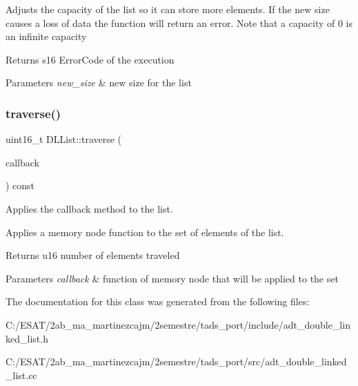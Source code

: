 Adjusts the capacity of the list so it can store more elements. If the new size causes a loss of data the function will return an error. Note that a capacity of 0 is an infinite capacity

\begin{DoxyReturn}{Returns}
s16 Error\+Code of the execution 
\end{DoxyReturn}

\begin{DoxyParams}{Parameters}
{\em new\+\_\+size} & new size for the list \\
\hline
\end{DoxyParams}
\mbox{\label{class_d_l_list_aee1a76258cd2af0af35ff68541810f46}} 
\subsubsection{\texorpdfstring{traverse()}{traverse()}}
{\footnotesize\ttfamily uint16\+\_\+t D\+L\+List\+::traverse (\begin{DoxyParamCaption}\item[{s16(Memory\+Node\+::$\ast$)()}]{callback }\end{DoxyParamCaption}) const}



Applies the callback method to the list. 

Applies a memory node function to the set of elements of the list.

\begin{DoxyReturn}{Returns}
u16 number of elements traveled 
\end{DoxyReturn}

\begin{DoxyParams}{Parameters}
{\em callback} & function of memory node that will be applied to the set \\
\hline
\end{DoxyParams}


The documentation for this class was generated from the following files\+:\begin{DoxyCompactItemize}
\item 
C\+:/\+E\+S\+A\+T/2ab\+\_\+ma\+\_\+martinezcajm/2semestre/tads\+\_\+port/include/adt\+\_\+double\+\_\+linked\+\_\+list.\+h\item 
C\+:/\+E\+S\+A\+T/2ab\+\_\+ma\+\_\+martinezcajm/2semestre/tads\+\_\+port/src/adt\+\_\+double\+\_\+linked\+\_\+list.\+cc\end{DoxyCompactItemize}
